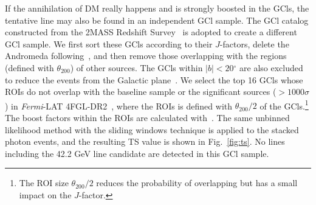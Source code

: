 \documentclass[
	twocolumn,
]{aastex6} %
\newcommand{\lat}{\emph{Fermi}-LAT\xspace}
\renewcommand{\deg}{\ensuremath{^{\circ}}\xspace}
\begin{document}
If the annihilation of DM really happens and is strongly boosted in the GCls, the tentative line may also be found in an independent GCl sample.
The GCl catalog constructed from the 2MASS Redshift Survey~\citep{Tully2015,Kourkchi2017,Lisanti2018} is adopted to create a different GCl sample.
We first sort these GCls according to their $J$-factors, delete the Andromeda following~\citet{Lisanti2018}, and then remove those overlapping with the regions (defined with $\theta_{200}$) of other sources.
The GCls within $|b|<20\deg$ are also excluded to reduce the events from the Galactic plane~\citep{Lisanti2018}.
We select the top 16 GCls whose ROIs do not overlap with the baseline sample or the significant sources ($>1000\sigma$) in \lat 4FGL-DR2~\citep{4FGL2020}, where the ROIs is defined with $\theta_{200}/2$ of the GCls.\footnote{The ROI size $\theta_{200}/2$ reduces the probability of overlapping but has a small impact on the $J$-factor.}
The boost factors within the ROIs are calculated with~\citep{SanchezConde2014,Gao2012}.
The same unbinned likelihood method with the sliding windows technique is applied to the stacked photon events, and the resulting TS value is shown in Fig.~\ref{fig:ts}.
No lines including the 42.2 GeV line candidate are detected in this GCl sample.
\end{document}

